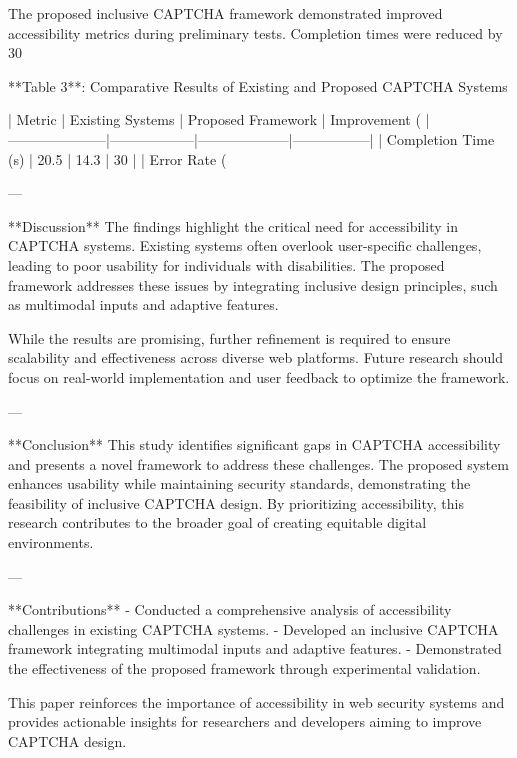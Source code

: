 The proposed inclusive CAPTCHA framework demonstrated improved accessibility metrics during preliminary tests. Completion times were reduced by 30%

**Table 3**: Comparative Results of Existing and Proposed CAPTCHA Systems  

| Metric              | Existing Systems | Proposed Framework | Improvement (%
|---------------------|------------------|--------------------|-----------------|  
| Completion Time (s) | 20.5             | 14.3               | 30              |  
| Error Rate (%

---

**Discussion**  
The findings highlight the critical need for accessibility in CAPTCHA systems. Existing systems often overlook user-specific challenges, leading to poor usability for individuals with disabilities. The proposed framework addresses these issues by integrating inclusive design principles, such as multimodal inputs and adaptive features.  

While the results are promising, further refinement is required to ensure scalability and effectiveness across diverse web platforms. Future research should focus on real-world implementation and user feedback to optimize the framework.  

---

**Conclusion**  
This study identifies significant gaps in CAPTCHA accessibility and presents a novel framework to address these challenges. The proposed system enhances usability while maintaining security standards, demonstrating the feasibility of inclusive CAPTCHA design. By prioritizing accessibility, this research contributes to the broader goal of creating equitable digital environments.  

---

**Contributions**  
- Conducted a comprehensive analysis of accessibility challenges in existing CAPTCHA systems.  
- Developed an inclusive CAPTCHA framework integrating multimodal inputs and adaptive features.  
- Demonstrated the effectiveness of the proposed framework through experimental validation.  

This paper reinforces the importance of accessibility in web security systems and provides actionable insights for researchers and developers aiming to improve CAPTCHA design.  
